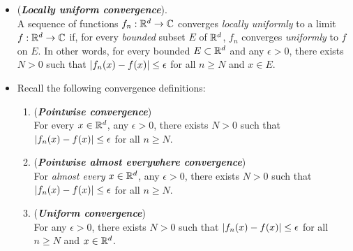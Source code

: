 \documentclass[11pt]{article}
\begin{document}
\begin{itemize}
\begin{proof}
\begin{itemize}
\item Again by triangle inequality, we only need to show that $\norm{h- g}{ L^1(\bR^d)}\le \epsilon$, where $g$ is the continuous function, $h= \ind{x\in E}$ is the step function.  For $E$ measureable in a normal space $\bR^{d}$, we can find an open box $F \supseteq \overline{E}$ such that $m^{*}(F - E)\le \epsilon$. Then following  the well-known \emph{Urysohn's lemma}, there exists a continuous function $g$ on $\bR^{d}$ such that $g(\overline{E})=1$ and $g(F^{c} )=0$ and $0\le g(x)\le 1$ otherwise. Therefore $g$ is the continuous, compactly supported function and $g(x)\ge \ind{x\in E}= h(x)$ with $\norm{h- g}{ L^1(\bR^d)}\le \epsilon$. \qed
\end{itemize}
\end{proof}

\item \begin{definition} (\emph{\textbf{Locally uniform convergence}}). \\
A sequence of functions $f_n : {\mathbb R}^d \rightarrow {\mathbb C}$ converges \emph{locally uniformly} to a limit $f : {\mathbb R}^d \rightarrow {\mathbb C}$ if, for every \emph{bounded} subset $E$ of ${\mathbb R}^d$, $f_n$ converges \emph{uniformly} to $f$ on $E$. In other words, for every bounded $E \subset {\mathbb R}^d$ and any $\epsilon > 0$, there exists $N > 0$ such that $\left\lvert f_n(x) - f(x) \right\rvert \le  \epsilon$ for all $n \ge N$ and $x \in E$.
\end{definition}

\item \begin{remark} Recall the following convergence definitions:
\begin{enumerate}
\item (\emph{\textbf{Pointwise convergence}})\\
 For every $x\in {\mathbb R}^{d}$, any $\epsilon > 0$, there exists $N > 0$ such that $\left\lvert f_n(x) - f(x) \right\rvert \le  \epsilon$ for all $n \ge N$.
\item (\emph{\textbf{Pointwise almost everywhere convergence}})\\
 For \emph{almost every} $x\in {\mathbb R}^{d}$, any $\epsilon > 0$, there exists $N > 0$ such that $\left\lvert f_n(x) - f(x) \right\rvert \le  \epsilon$ for all $n \ge N$.
\item (\emph{\textbf{Uniform convergence}})\\
For any $\epsilon > 0$, there exists $N > 0$ such that $\left\lvert f_n(x) - f(x) \right\rvert \le  \epsilon$ for all $n \ge N$ and $x \in {\mathbb R}^{d}$.
\end{enumerate}
\end{remark}


\end{itemize}
\end{document}
